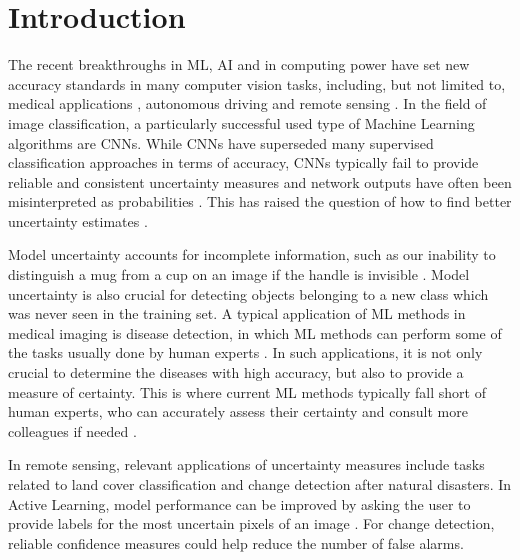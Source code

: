 \documentclass[10pt]{article}
\begin{document}
\newpage
\glsunsetall
{}
\tableofcontents
{}
\listoffigures
{}
\listoftables
\glsresetall
\clearpage
\setlength{\glsdescwidth}{\linewidth}

\printglossaries
\clearpage

\setcounter{page}{1}
\section{Introduction}
The recent breakthroughs in \gls{ML}, \gls{AI} and in computing power have set new accuracy standards in many computer vision tasks, including, but not limited to, medical applications \cite{leibig2017, ronneberger2015u}, autonomous driving \cite{Levinson2011TowardsFA} and remote sensing \cite{Volpi2017DenseSL, kampffmeyer, Zhu2017DeepLI, Shelhamer2015FullyCN}. In the field of image classification, a particularly successful used type of Machine Learning algorithms are \glspl{CNN}. While \glspl{CNN} have superseded many supervised classification approaches in terms of accuracy, \glspl{CNN} typically fail to provide reliable and consistent uncertainty measures and network outputs have often been misinterpreted as probabilities \cite{NguyenYC14, Goodfellow2014}. This has raised the question of how to find better uncertainty estimates \cite{KendallG17, Gal2016Uncertainty}.

Model uncertainty accounts for incomplete information, such as our inability to distinguish a mug from a cup on an image if the handle is invisible \cite{Rupprecht2017LearningIA}. Model uncertainty is also crucial for detecting objects belonging to a new class which was never seen in the training set. A typical application of \gls{ML} methods in medical imaging is disease detection, in which \gls{ML} methods can perform some of the tasks usually done by human experts \cite{leibig2017}. In such applications, it is not only crucial to determine the diseases with high accuracy, but also to provide a measure of certainty. This is where current \gls{ML} methods typically fall short of human experts, who can accurately assess their certainty and consult more colleagues if needed \cite{leibig2017}.

In remote sensing, relevant applications of uncertainty measures include tasks related to land cover classification and change detection after natural disasters. In Active Learning, model performance can be improved by asking the user to provide labels for the most uncertain pixels of an image \cite{menderes_automatic_2015, womble_automated_2007, postadjian_investigating_2017, tuiaAL2011, Tuia2011ASO}. For change detection, reliable confidence measures could help reduce the number of false alarms.
\end{document}
